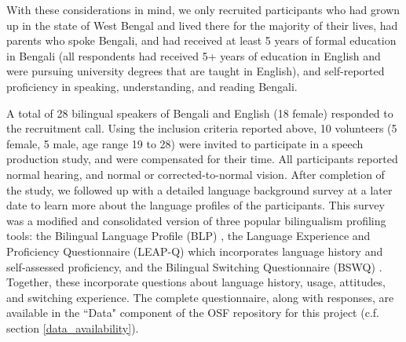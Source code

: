 \documentclass[12 pt]{article}
\begin{document}
With these considerations in mind, we only recruited participants who had grown up in the state of West Bengal and lived there for the majority of their lives, had parents who spoke Bengali, and had received at least 5 years of formal education in Bengali (all respondents had received 5+ years of education in English and were pursuing university degrees that are taught in English), and self-reported proficiency in speaking, understanding, and reading Bengali. 
   
A total of 28 bilingual speakers of Bengali and English (18 female) responded to the recruitment call. Using the inclusion criteria reported above, 10 volunteers (5 female, 5 male, age range 19 to 28) were invited to participate in a speech production study, and were compensated for their time. All participants reported normal hearing, and normal or corrected-to-normal vision. After completion of the study, we followed up with a detailed language background survey at a later date to learn more about the language profiles of the participants. This survey was a modified and consolidated version of three popular bilingualism profiling tools: the Bilingual Language Profile (BLP) \citep{blp}, the Language Experience and Proficiency Questionnaire (LEAP-Q) \citep{leap-q} which incorporates language history and self-assessed proficiency, and the Bilingual Switching Questionnaire (BSWQ) \citep{language_switching_questionnaire}. Together, these incorporate questions about language history, usage, attitudes, and switching experience. The complete questionnaire, along with responses, are available in the ``Data" component of the OSF repository for this project (c.f. section \ref{data_availability}). 
\end{document}
